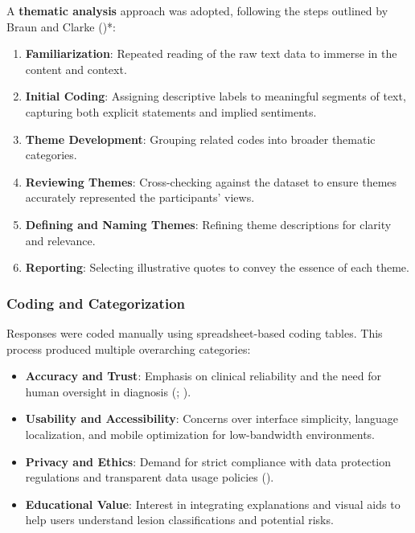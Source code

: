 \documentclass[
  12pt,
  oneside]{article}
\providecommand{\tightlist}{%
  \setlength{\itemsep}{0pt}\setlength{\parskip}{0pt}}
\begin{document}
A \textbf{thematic analysis} approach was adopted, following the steps
outlined by Braun and Clarke ()*:

\begin{enumerate}
\def\labelenumi{\arabic{enumi}.}
\tightlist
\item
  \textbf{Familiarization}: Repeated reading of the raw text data to
  immerse in the content and context.
\item
  \textbf{Initial Coding}: Assigning descriptive labels to meaningful
  segments of text, capturing both explicit statements and implied
  sentiments.
\item
  \textbf{Theme Development}: Grouping related codes into broader
  thematic categories.
\item
  \textbf{Reviewing Themes}: Cross-checking against the dataset to
  ensure themes accurately represented the participants' views.
\item
  \textbf{Defining and Naming Themes}: Refining theme descriptions for
  clarity and relevance.
\item
  \textbf{Reporting}: Selecting illustrative quotes to convey the
  essence of each theme.
\end{enumerate}

\subsubsection{Coding and
Categorization}\label{coding-and-categorization}

Responses were coded manually using spreadsheet-based coding tables.
This process produced multiple overarching categories:

\begin{itemize}
\tightlist
\item
  \textbf{Accuracy and Trust}: Emphasis on clinical reliability and the
  need for human oversight in diagnosis
  (;
  ).
\item
  \textbf{Usability and Accessibility}: Concerns over interface
  simplicity, language localization, and mobile optimization for
  low-bandwidth environments.
\item
  \textbf{Privacy and Ethics}: Demand for strict compliance with data
  protection regulations and transparent data usage policies
  ().
\item
  \textbf{Educational Value}: Interest in integrating explanations and
  visual aids to help users understand lesion classifications and
  potential risks.
\end{itemize}
\end{document}
